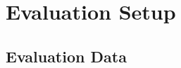 \documentclass[11pt]{article}
\begin{document}



\section{Evaluation Setup}

\subsection{Evaluation Data}


\end{document}
